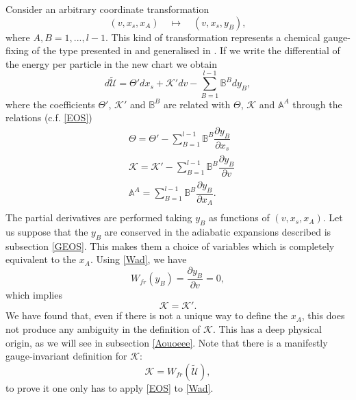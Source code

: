 \documentclass[useAMS,usenatbib,prd,twocolumn,nofootinbib]{revtex4-1}
\begin{document}
Consider an arbitrary coordinate transformation
\begin{equation}\label{qqq}
(v,x_s,x_A) \quad \longmapsto \quad (v,x_s,y_B) ,
\end{equation}
where $A,B=1,...,l-1$. This kind of transformation represents a chemical gauge-fixing of the type presented in \cite{carter_macro_2006} and generalised in \cite{Termo}. If we write the differential of the energy per particle in the new chart we obtain
\begin{equation}
d\tilde{\mathcal{U}} = \Theta' dx_s + \mathcal{K}' dv  - \sum_{B=1}^{l-1} \mathbb{B}^B d y_B ,
\end{equation}
where the coefficients $\Theta'$, $\mathcal{K}'$ and $\mathbb{B}^B$ are related with $\Theta$, $\mathcal{K}$ and $\mathbb{A}^A$ through the relations (c.f. \eqref{EOS})
\begin{equation}\label{gaugiandotutto}
\begin{split}
& \Theta = \Theta' - \sum_{B=1}^{l-1} \mathbb{B}^B \dfrac{\partial y_B}{\partial x_s} \\
& \mathcal{K}= \mathcal{K}'-\sum_{B=1}^{l-1} \mathbb{B}^B \dfrac{\partial y_B}{\partial v} \\
& \mathbb{A}^A = \sum_{B=1}^{l-1} \mathbb{B}^B \dfrac{\partial y_B}{\partial x_A}. \\
\end{split}
\end{equation}
The partial derivatives are performed taking  $y_B$  as functions of $(v,x_s,x_A)$. Let us suppose that the $y_B$ are conserved in the adiabatic expansions described is subsection \ref{GEOS}. This makes them a choice of variables which is completely equivalent to the $x_A$. Using \eqref{Wad}, we have
\begin{equation}\label{aDDib}
W_{fr}(y_B) = \dfrac{\partial y_B}{\partial v} =0,
\end{equation}
which implies
\begin{equation}
\mathcal{K} = \mathcal{K}'.
\end{equation}
We have found that, even if there is not a unique way to define the $x_A$, this does not produce any ambiguity in the definition of $\mathcal{K}$. This has a deep physical origin, as we will see in subsection \ref{Aouoeee}. Note that there is a manifestly gauge-invariant definition for $\mathcal{K}$:
\begin{equation}\label{KkK}
\mathcal{K} = W_{fr}(\tilde{\mathcal{U}}),
\end{equation}
to prove it one only has to apply \eqref{EOS} to \eqref{Wad}.
\end{document}
